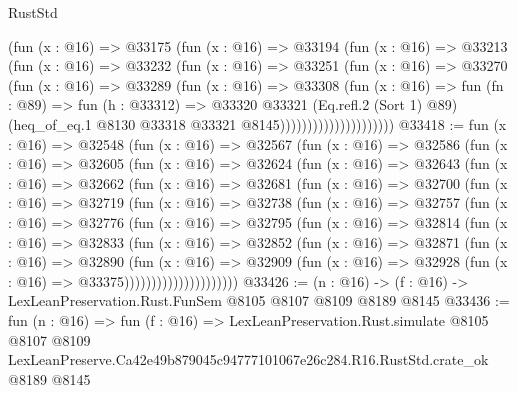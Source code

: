 \begin{lexlean}{RustStd}
\begin{coremodule}
                          (fun (x : @16) =>
                          @33175
                            (fun (x : @16) =>
                            @33194
                              (fun (x : @16) =>
                              @33213
                                (fun (x : @16) =>
                                @33232
                                  (fun (x : @16) =>
                                  @33251
                                    (fun (x : @16) =>
                                    @33270
                                      (fun (x : @16) =>
                                      @33289
                                        (fun (x : @16) =>
                                        @33308
                                          (fun (x : @16) =>
                                          fun (fn : @89) =>
                                          fun (h : @33312) =>
                                          @33320
                                            @33321
                                            (Eq.refl.{2} (Sort 1) @89)
                                            (heq_of_eq.{1}
                                              @8130
                                              @33318
                                              @33321
                                              @8145)))))))))))))))))))))
@33418 := fun (x : @16) =>
  @32548
    (fun (x : @16) =>
    @32567
      (fun (x : @16) =>
      @32586
        (fun (x : @16) =>
        @32605
          (fun (x : @16) =>
          @32624
            (fun (x : @16) =>
            @32643
              (fun (x : @16) =>
              @32662
                (fun (x : @16) =>
                @32681
                  (fun (x : @16) =>
                  @32700
                    (fun (x : @16) =>
                    @32719
                      (fun (x : @16) =>
                      @32738
                        (fun (x : @16) =>
                        @32757
                          (fun (x : @16) =>
                          @32776
                            (fun (x : @16) =>
                            @32795
                              (fun (x : @16) =>
                              @32814
                                (fun (x : @16) =>
                                @32833
                                  (fun (x : @16) =>
                                  @32852
                                    (fun (x : @16) =>
                                    @32871
                                      (fun (x : @16) =>
                                      @32890
                                        (fun (x : @16) =>
                                        @32909
                                          (fun (x : @16) =>
                                          @32928 (fun (x : @16) => @33375)))))))))))))))))))))
@33426 := (n : @16) -> (f : @16) -> LexLeanPreservation.Rust.FunSem @8105 @8107 @8109 @8189 @8145
@33436 := fun (n : @16) =>
  fun (f : @16) =>
  LexLeanPreservation.Rust.simulate
    @8105
    @8107
    @8109
    LexLeanPreserve.Ca42e49b879045c94777101067e26c284.R16.RustStd.crate_ok
    @8189
    @8145
\end{coremodule}
\end{lexlean}
